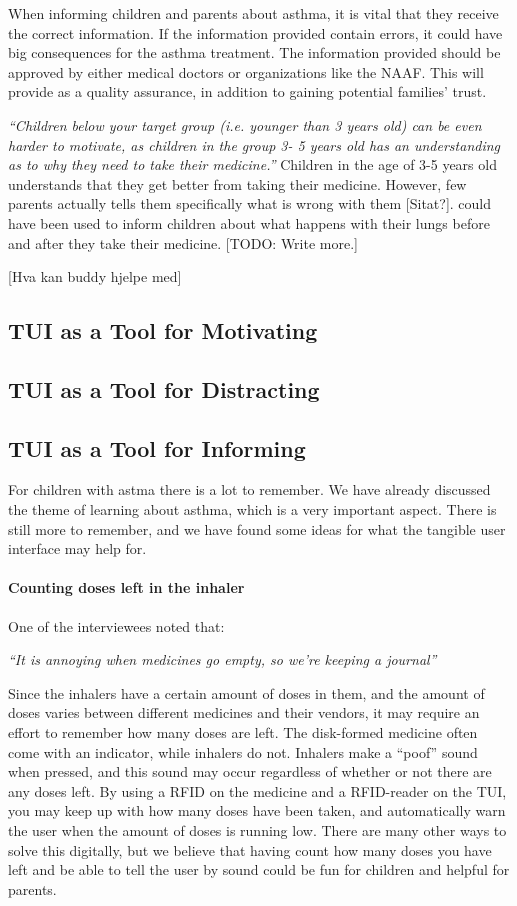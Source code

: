 When informing children and parents about asthma, it is vital that they receive the correct information. If the information provided contain errors, it could have big consequences for the asthma treatment. The information provided should be approved by either medical doctors or organizations like the NAAF. This will provide as a quality assurance, in addition to gaining potential families' trust.    

\textit{``Children below your target group (i.e. younger than 3 years old) can be even harder to motivate, as children in the group 3- 5 years old has an understanding as to why they need to take their medicine.''}
Children in the age of 3-5 years old understands that they get better from taking their medicine. However, few parents actually tells them specifically what is wrong with them [Sitat?]. \buddy{} could have been used to inform children about what happens with their lungs before and after they take their medicine. 
[TODO: Write more.] 

[Hva kan buddy hjelpe med]

\subsection{TUI as a Tool for Motivating}


\subsection{TUI as a Tool for Distracting} 


\subsection{TUI as a Tool for Informing}
For children with astma there is a lot to remember. We have already discussed the theme of learning about asthma, which is a very important aspect. There is still more to remember, and we have found some ideas for what the tangible user interface may help for. 

\paragraph{Counting doses left in the inhaler}
One of the interviewees noted that: 

\textit{``It is annoying when medicines go empty, so we're keeping a journal''}

Since the inhalers have a certain amount of doses in them, and the amount of doses varies between different medicines and their vendors, it may require an effort to remember how many doses are left. The disk-formed medicine often come with an indicator, while inhalers do not. Inhalers make a ``poof'' sound when pressed, and this sound may occur regardless of whether or not there are any doses left. By using a RFID on the medicine and a RFID-reader on the TUI, you may keep up with how many doses have been taken, and automatically warn the user when the amount of doses is running low. There are many other ways to solve this digitally, but we believe that having \buddy{} count how many doses you have left and be able to tell the user by sound could be fun for children and helpful for parents.

